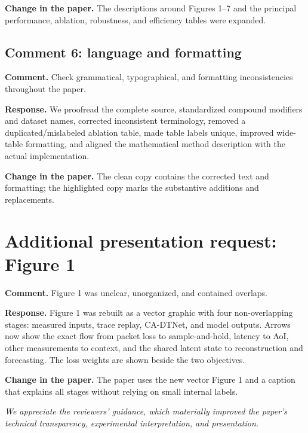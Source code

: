 \documentclass[11pt]{article}
\newcommand{\reviewcomment}[1]{\par\textcolor{commentblue}{\textbf{Comment.} #1}\par}
\newcommand{\authorresponse}[1]{\par\textcolor{responsegreen}{\textbf{Response.} #1}\par}
\newcommand{\paperchange}[1]{\par\textbf{Change in the paper.} #1\par}
\begin{document}
\paperchange{The descriptions around Figures 1--7 and the principal performance, ablation, robustness, and efficiency tables were expanded.}

\subsection*{Comment 6: language and formatting}

\reviewcomment{Check grammatical, typographical, and formatting inconsistencies throughout the paper.}

\authorresponse{We proofread the complete source, standardized compound modifiers and dataset names, corrected inconsistent terminology, removed a duplicated/mislabeled ablation table, made table labels unique, improved wide-table formatting, and aligned the mathematical method description with the actual implementation.}

\paperchange{The clean copy contains the corrected text and formatting; the highlighted copy marks the substantive additions and replacements.}

\section*{Additional presentation request: Figure 1}

\reviewcomment{Figure 1 was unclear, unorganized, and contained overlaps.}

\authorresponse{Figure 1 was rebuilt as a vector graphic with four non-overlapping stages: measured inputs, trace replay, CA-DTNet, and model outputs. Arrows now show the exact flow from packet loss to sample-and-hold, latency to AoI, other measurements to context, and the shared latent state to reconstruction and forecasting. The loss weights are shown beside the two objectives.}

\paperchange{The paper uses the new vector Figure 1 and a caption that explains all stages without relying on small internal labels.}

\vfill
\begin{center}
\textit{We appreciate the reviewers' guidance, which materially improved the paper's technical transparency, experimental interpretation, and presentation.}
\end{center}
\end{document}
